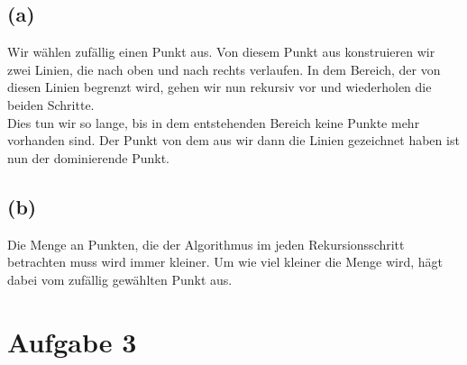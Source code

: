 \documentclass[a4paper]{scrartcl}
\begin{document}
\subsection*{(a)} %
Wir wählen zufällig einen Punkt aus. Von diesem Punkt aus konstruieren wir zwei Linien, die nach oben und nach rechts verlaufen. In dem Bereich, der von diesen Linien begrenzt wird, gehen wir nun rekursiv vor und wiederholen die beiden Schritte.\\
Dies tun wir so lange, bis in dem entstehenden Bereich keine Punkte mehr vorhanden sind. Der Punkt von dem aus wir dann die Linien gezeichnet haben ist nun der dominierende Punkt.


\subsection*{(b)}
Die Menge an Punkten, die der Algorithmus im jeden Rekursionsschritt betrachten muss wird immer kleiner. Um wie viel kleiner die Menge wird, hägt dabei vom zufällig gewählten Punkt aus.








\section*{Aufgabe 3}
\end{document}
